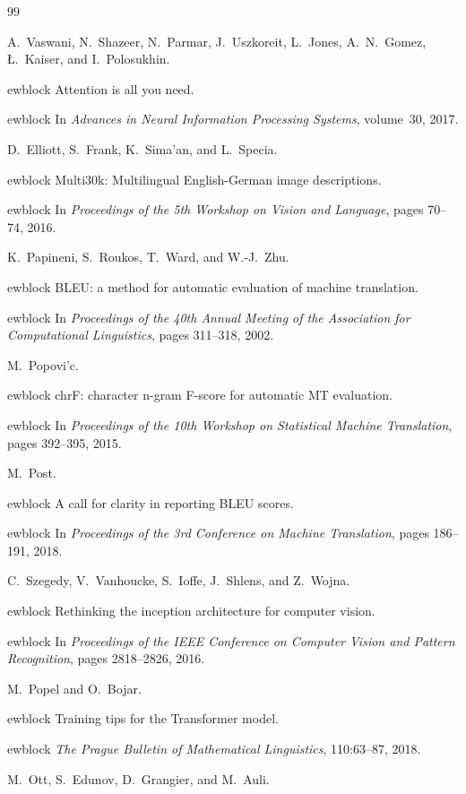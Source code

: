 \documentclass[10pt]{article}
\begin{document}

\begin{thebibliography}{99}

A.~Vaswani, N.~Shazeer, N.~Parmar, J.~Uszkoreit, L.~Jones, A.~N.~Gomez, {\L.}~Kaiser, and I.~Polosukhin.

ewblock Attention is all you need.

ewblock In \emph{Advances in Neural Information Processing Systems}, volume~30, 2017.

D.~Elliott, S.~Frank, K.~Sima'an, and L.~Specia.

ewblock Multi30k: Multilingual English-German image descriptions.

ewblock In \emph{Proceedings of the 5th Workshop on Vision and Language}, pages 70--74, 2016.

K.~Papineni, S.~Roukos, T.~Ward, and W.-J.~Zhu.

ewblock BLEU: a method for automatic evaluation of machine translation.

ewblock In \emph{Proceedings of the 40th Annual Meeting of the Association for Computational Linguistics}, pages 311--318, 2002.

M.~Popovi'c.

ewblock chrF: character n-gram F-score for automatic MT evaluation.

ewblock In \emph{Proceedings of the 10th Workshop on Statistical Machine Translation}, pages 392--395, 2015.

M.~Post.

ewblock A call for clarity in reporting BLEU scores.

ewblock In \emph{Proceedings of the 3rd Conference on Machine Translation}, pages 186--191, 2018.

C.~Szegedy, V.~Vanhoucke, S.~Ioffe, J.~Shlens, and Z.~Wojna.

ewblock Rethinking the inception architecture for computer vision.

ewblock In \emph{Proceedings of the IEEE Conference on Computer Vision and Pattern Recognition}, pages 2818--2826, 2016.

M.~Popel and O.~Bojar.

ewblock Training tips for the Transformer model.

ewblock \emph{The Prague Bulletin of Mathematical Linguistics}, 110:63--87, 2018.

M.~Ott, S.~Edunov, D.~Grangier, and M.~Auli.


\end{thebibliography}
\end{document}
